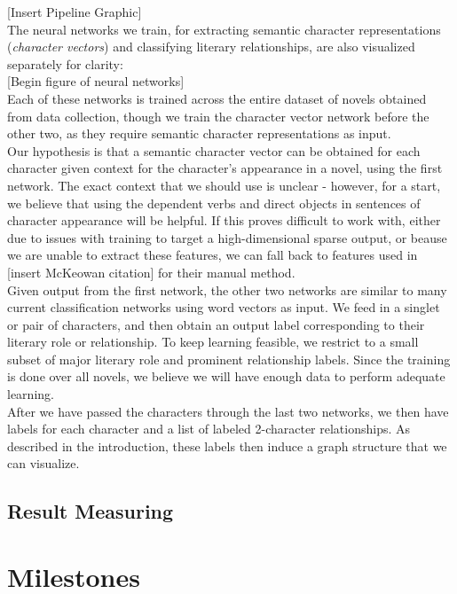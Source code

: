 \documentclass[dvips,12pt]{article}
\begin{document}
    [Insert Pipeline Graphic] \\

    The neural networks we train, for extracting semantic character representations (\emph{character vectors}) and classifying literary relationships, are also visualized separately for clarity: \\ 

    [Begin figure of neural networks] \\

    Each of these networks is trained across the entire dataset of novels obtained from data collection, though we train the character vector network before the other two, as they require semantic character representations as input.  \\

    Our hypothesis is that a semantic character vector can be obtained for each character given context for the character's appearance in a novel, using the first network. The exact context that we should use is unclear - however, for a start, we believe that using the dependent verbs and direct objects in sentences of character appearance will be helpful. If this proves difficult to work with, either due to issues with training to target a high-dimensional sparse output, or beause we are unable to extract these features, we can fall back to features used in [insert McKeowan citation] for their manual method. \\

    Given output from the first network, the other two networks are similar to many current classification networks using word vectors as input. We feed in a singlet or pair of characters, and then obtain an output label corresponding to their literary role or relationship. To keep learning feasible, we restrict to a small subset of major literary role and prominent relationship labels. Since the training is done over all novels, we believe we will have enough data to perform adequate learning. \\

    After we have passed the characters through the last two networks, we then have labels for each character and a list of labeled 2-character relationships. As described in the introduction, these labels then induce a graph structure that we can visualize. 

\subsection{Result Measuring}
\section{Milestones}
\end{document}
